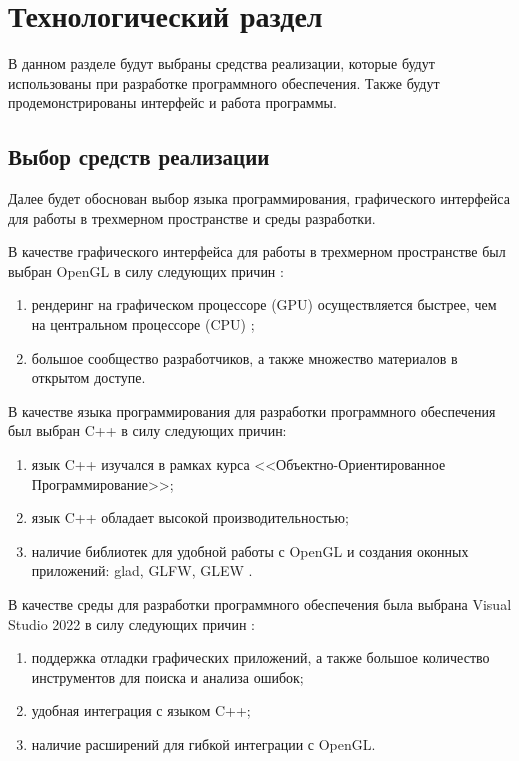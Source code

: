 \chapter{Технологический раздел}

В данном разделе будут выбраны средства реализации, которые будут использованы при разработке программного обеспечения.
Также будут продемонстрированы интерфейс и работа программы.

\section{Выбор средств реализации}

Далее будет обоснован выбор языка программирования, графического интерфейса для работы в трехмерном пространстве и среды разработки.

В качестве графического интерфейса для работы в трехмерном пространстве был выбран OpenGL в силу следующих причин \cite{OpenGL}:
\begin{enumerate}
	\item рендеринг на графическом процессоре (GPU) осуществляется быстрее, чем на центральном процессоре (CPU) \cite{gpuFaster};
	\item большое сообщество разработчиков, а также множество материалов в открытом доступе.
\end{enumerate}

В качестве языка программирования для разработки программного обеспечения был выбран C++ в силу следующих причин:
\begin{enumerate}
	\item язык C++ изучался в рамках курса <<Объектно-Ориентированное Программирование>>;
	\item язык C++ обладает высокой производительностью;
	\item наличие библиотек для удобной работы с OpenGL и создания оконных приложений: glad, GLFW, GLEW \cite{glLibs}.
\end{enumerate}

В качестве среды для разработки программного обеспечения была выбрана Visual Studio 2022 в силу следующих причин \cite{vs2022}:
\begin{enumerate}
	\item поддержка отладки графических приложений, а также большое количество инструментов для поиска и анализа ошибок;
	\item удобная интеграция с языком C++;
	\item наличие расширений для гибкой интеграции с OpenGL.
\end{enumerate}

